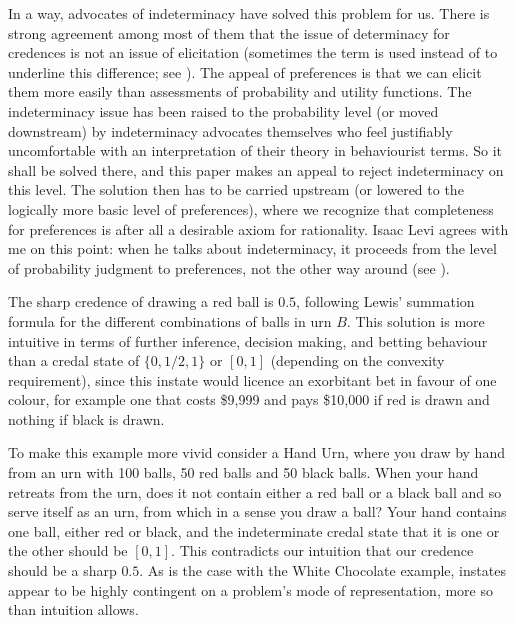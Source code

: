 \documentclass[11pt]{article}
\begin{document}
In a way, advocates of indeterminacy have solved this problem for us.
There is strong agreement among most of them that the issue of
determinacy for credences is not an issue of elicitation (sometimes
the term  is used instead of 
to underline this difference; see ). The appeal
of preferences is that we can elicit them more easily than assessments
of probability and utility functions. The indeterminacy issue has been
raised to the probability level (or moved downstream) by indeterminacy
advocates themselves who feel justifiably uncomfortable with an
interpretation of their theory in behaviourist terms. So it shall be
solved there, and this paper makes an appeal to reject indeterminacy
on this level. The solution then has to be carried upstream (or
lowered to the logically more basic level of preferences), where we
recognize that completeness for preferences is after all a desirable
axiom for rationality. Isaac Levi agrees with me on this point: when
he talks about indeterminacy, it proceeds from the level of
probability judgment to preferences, not the other way around (see
).


The sharp credence of drawing a red ball is $0.5$, following Lewis'
summation formula for the different combinations of balls in urn $B$.
This solution is more intuitive in terms of further inference,
decision making, and betting behaviour than a credal state of
$\{0,1/2,1\}$ or $[0,1]$ (depending on the convexity requirement),
since this instate would licence an exorbitant bet in favour of one
colour, for example one that costs \$9,999 and pays \$10,000 if red is
drawn and nothing if black is drawn.

To make this example more vivid consider a Hand Urn, where you draw by
hand from an urn with 100 balls, 50 red balls and 50 black balls. When
your hand retreats from the urn, does it not contain either a red ball
or a black ball and so serve itself as an urn, from which in a sense
you draw a ball? Your hand contains one ball, either red or black, and
the indeterminate credal state that it is one or the other should be
$[0,1]$. This contradicts our intuition that our credence should be a
sharp $0.5$. As is the case with the White Chocolate example, instates
appear to be highly contingent on a problem's mode of representation,
more so than intuition allows.
\end{document}
